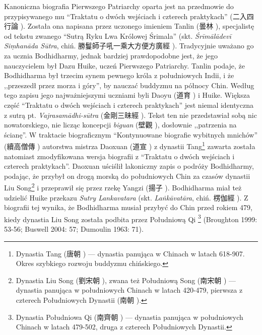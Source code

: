 Kanoniczna biografia Pierwszego Patriarchy oparta jest na przedmowie do przypisywanego mu ``Traktatu o dwóch wejściach i czterech praktykach'' (二入四行論 ).
Została ona napisana przez uczonego imieniem Tanlin (曇林 ), specjalistę od tekstu zwanego ``Sutrą Ryku Lwa Królowej Śrimala'' (skt. \textit{Śrīmālādevī Si\d{m}hanāda Sūtra}, chiń. 勝鬘師子吼一乘大方便方廣經 ).
Tradycyjnie uważano go za ucznia Bodhidharmy, jednak bardziej prawdopodobne jest, że jego nauczycielem był Dazu Huike, uczeń Pierwszego Patriarchy.
Tanlin podaje, że Bodhidharma był trzecim synem pewnego króla z południowych Indii, i że ,,przeszedł przez morza i góry'', by nauczać buddyzmu na północy Chin.
Według tego zapisu jego najważniejszymi uczniami byli Daoyu (道育 ) i Huike.
Większa część ``Traktatu o dwóch wejściach i czterech praktykach'' jest niemal identyczna z sutrą pt. \textit{Vajrasamādhi-sūtra} (金剛三昧經 ).
Tekst ten nie przedstawiał sobą nic nowatorskiego, nie licząc koncepcji \textit{biguan} (壁觀 ), dosłownie ,,patrzenia na ścianę''.
W traktacie biograficznym ``Kontynuowane biografie wybitnych mnichów'' (續高僧傳 ) autorstwa mistrza Daoxuan (道宣 ) z dynastii Tang\footnote{Dynastia Tang (唐朝 ) --- dynastia panująca w Chinach w latach 618-907. Okres szybkiego rozwoju buddyzmu chińskiego.} zawarta została natomiast zmodyfikowana wersja biografii z ``Traktatu o dwóch wejściach i czterech praktykach''.
Daoxuan uściślił lakoniczny zapis o podróży Bodhidharmy, podając, że przybył on drogą morską do południowych Chin za czasów dynastii Liu Song\footnote{Dynastia Liu Song (劉宋朝 ), zwana też Południową Song (南宋朝 ) --- dynastia panująca w południowych Chinach w latach 420-479, pierwsza z czterech Południowych Dynastii (南朝 ).} i przeprawił się przez rzekę Yangzi (揚子 ).
Bodhidharma miał też udzielić Huike przekazu \textit{Sutry Lankavatara} (skt. \textit{La\.nkāvatāra}, chiń. 楞伽經 ).
Z biografii tej wynika, że Bodhidharma musiał przybyć do Chin przed rokiem 479, kiedy dynastia Liu Song została podbita przez Południową Qi%
\footnote{Dynastia Południowa Qi (南齊朝 ) --- dynastia panująca w południowych Chinach w latach 479-502, druga z czterech Południowych Dynastii.}
(Broughton 1999: 53-56; Buswell 2004: 57; Dumoulin 1963: 71).

